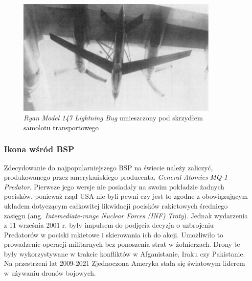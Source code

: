 \begin{figure}[!ht]
\begin{center}
  \includegraphics[width=10cm]{./Obrazy/Model_147_RPV.png}
  \caption{\textit{Ryan Model 147 Lightning Bug} umieszczony pod skrzydłem samolotu transportowego}
\end{center}
\end{figure}

\subsubsection{Ikona wśród BSP}
Zdecydowanie do najpopularniejszego BSP na świecie należy zaliczyć, produkowanego przez amerykańskiego producenta, \textit{General Atomics} \textit{MQ-1 Predator}. Pierwsze jego wersje nie posiadały na swoim pokładzie żadnych pocisków, ponieważ rząd USA nie byli pewni czy jest to zgodne z obowiązującym układem dotyczącym całkowitej likwidacji pocisków rakietowych średniego zasięgu (ang. \textit{Intemediate-range Nuclear Forces (INF) Traty}). Jednak wydarzenia z 11 września 2001 r. były impulsem do podjęcia decyzja o uzbrojeniu Predatorów w pociski rakietowe i skierowania ich do akcji. Umożliwiło to prowadzenie operacji militarnych bez ponoszenia strat w żołnierzach. Drony te były wykorzystywane w trakcie konfliktów w Afganistanie, Iraku czy Pakistanie. Na przestrzeni lat 2009-2021 Zjednoczona Ameryka stała się światowym liderem w używaniu dronów bojowych.\cite{dron-ibuk}\cite{predator-wiki} 


